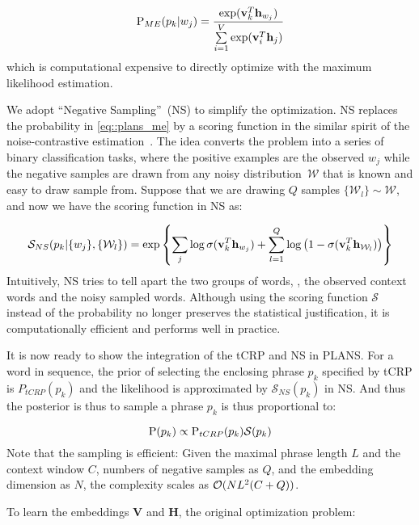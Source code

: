 \begin{equation}
  \P_{ME}(p_k | w_{j}) =
  \frac{\exp(\vv_k^T \vh_{w_j})}{\sum\limits_{i=1}^V \exp(\vv_i^T \vh_j)}
  \label{eq::plans_me}
\end{equation}
%
which is computational expensive to directly optimize with the maximum
likelihood estimation.

We adopt ``Negative Sampling''~(NS) to simplify the optimization. NS replaces
the probability in \eqref{eq::plans_me} by a scoring function in the similar
spirit of the noise-contrastive estimation~\cite{gutmann2010noise}. The idea
converts the problem into a series of binary classification tasks, where the
positive examples are the observed $w_j$ while the negative samples are drawn
from any noisy distribution~$\mathcal{W}$ that is known and easy to draw sample
from. Suppose that we are drawing $Q$ samples $\{\mathcal{W}_l\} \sim
\mathcal{W}$, and now we have the scoring function in NS as:

\begin{equation}
  \mathcal{S}_{NS}(p_k | \{w_j\}, \{\mathcal{W}_l\}) = \exp\left\{
    \sum\limits_j \log\sigma(\vv_k^T \vh_{w_j}) +
    \sum\limits_{l=1}^Q \log\big( 1 - \sigma( \vv_k^T \vh_{\mathcal{W}_l} )\big)
  \right\}
  \label{eq::plans_ns}
\end{equation}
%
Intuitively, NS tries to tell apart the two groups of words, \ie, the observed
context words and the noisy sampled words. Although using the scoring function
$\mathcal{S}$ instead of the probability no longer preserves the statistical
justification, it is computationally efficient and performs well in practice.

It is now ready to show the integration of the tCRP and NS in PLANS. For a word
in sequence, the prior of selecting the enclosing phrase $p_k$ specified by tCRP
is $P_{tCRP}(p_k)$ and the likelihood is approximated by $\mathcal{S}_{NS}(p_k)$
in NS. And thus the posterior is thus  to sample a phrase $p_k$ is thus
proportional to:

\begin{equation}
  \P(p_k) \propto \P_{tCRP}(p_k) \mathcal{S}(p_k) \label{eq::plans_post}
\end{equation}
%
Note that the sampling is efficient: Given the maximal phrase length $L$ and the
context window $C$, numbers of negative samples as $Q$, and the embedding
dimension as $N$, the complexity scales as $\oo(NL^2(C+Q))$.

To learn the embeddings $\mathbf{V}$ and $\mathbf{H}$, the original optimization
problem:

